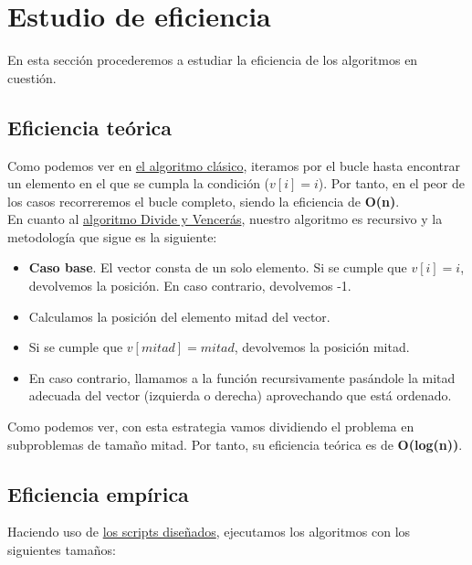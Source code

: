 \documentclass[12pt,spanish]{article}
\begin{document}
\newpage

\section{Estudio de eficiencia}

En esta sección procederemos a estudiar la eficiencia de los algoritmos en cuestión.

\subsection{Eficiencia teórica}

Como podemos ver en \textcolor{blue!60}{\hyperref[alg:clasico]{el algoritmo clásico}}, iteramos por el bucle hasta encontrar un elemento en el que se cumpla la condición ($v[i]=i$). Por tanto, en el peor de los casos recorreremos el bucle completo, siendo la eficiencia de \textbf{O(n)}.\\

En cuanto al \textcolor{blue!60}{\hyperref[alg:clasico]{algoritmo Divide y Vencerás}}, nuestro algoritmo es recursivo y la metodología que sigue es la siguiente:
\begin{itemize}
	\item \textbf{Caso base}. El vector consta de un solo elemento. Si se cumple que $v[i]=i$, devolvemos \textcolor{blue!90}{la posición}. En caso contrario, devolvemos \textcolor{blue!90}{-1}.
	\item Calculamos la posición del elemento mitad del vector.
	\item Si se cumple que $v[mitad]=mitad$, devolvemos \textcolor{blue!90}{la posición mitad}.
	\item En caso contrario, llamamos a la función recursivamente pasándole la mitad adecuada del vector (izquierda o derecha) aprovechando que está ordenado.
\end{itemize}

Como podemos ver, con esta estrategia vamos dividiendo el problema en subproblemas de tamaño mitad. Por tanto, su eficiencia teórica es de \textbf{O(log(n))}.

\subsection{Eficiencia empírica}

Haciendo uso de \textcolor{blue!60}{\hyperref[sec:scripts]{los scripts diseñados}}, ejecutamos los algoritmos con los siguientes tamaños:
\end{document}
